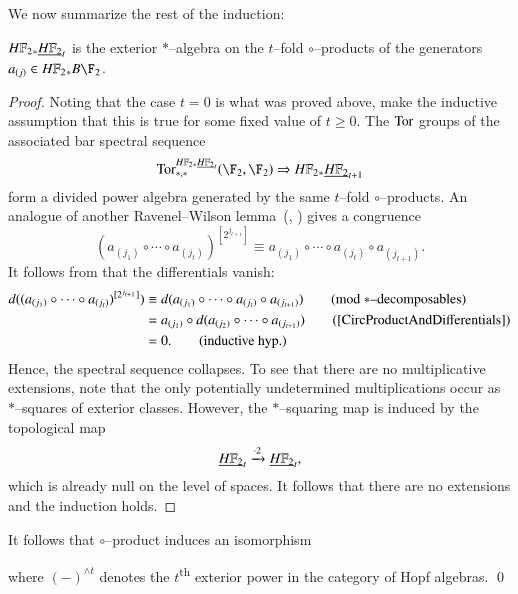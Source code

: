 We now summarize the rest of the induction:
\begin{theorem}\label{UnstableSteenrodInduction}
$\HFtwo_* \OS{\HFtwo}{t}$ is the exterior $\ast$--algebra on the $t$--fold $\circ$--products of the generators $a_{(j)} \in \HFtwo_* B\F_2$.
\end{theorem}
\begin{proof}
Noting that the case $t = 0$ is what was proved above, make the inductive assumption that this is true for some fixed value of $t \ge 0$.  The $\operatorname{Tor}$ groups of the associated bar spectral sequence \[\Tor^{\HFtwo_* \OS{\HFtwo}{t}}_{*, *}(\F_2, \F_2) \Rightarrow \HFtwo_* \OS{\HFtwo}{t+1}\] form a divided power algebra generated by the same $t$--fold $\circ$--products.  An analogue of another Ravenel--Wilson lemma~(\cite[Lemma 9.5]{RavenelWilsonKthyOfEMSpaces}, \cite[Claim 8.16]{Wilson}) gives a congruence \[(a_{(j_1)} \circ \cdots \circ a_{(j_t)})^{[2^{j_{t+1}}]} \equiv a_{(j_1)} \circ \cdots \circ a_{(j_t)} \circ a_{(j_{t+1})} \tag{mod $\ast$--decomposables}.\]  It follows from  that the differentials vanish:
\begin{align*}
d((a_{(j_1)} \circ \cdots \circ a_{(j_t)})^{[2^{j_{t+1}}]}) & \equiv d(a_{(j_1)} \circ \cdots \circ a_{(j_t)} \circ a_{(j_{t+1})}) \tag{mod $\ast$--decomposables} \\
& = a_{(j_1)} \circ d(a_{(j_2)} \circ \cdots \circ a_{(j_{t+1})}) \tag{\Cref{CircProductAndDifferentials}} \\
& = 0. \tag{inductive hyp.}
\end{align*}
Hence, the spectral sequence collapses.  To see that there are no multiplicative extensions, note that the only potentially undetermined multiplications occur as $\ast$--squares of exterior classes.  However, the $\ast$--squaring map is induced by the topological map \[\OS{\HFtwo}{t} \xrightarrow{\cdot 2} \OS{\HFtwo}{t},\] which is already null on the level of spaces.  It follows that there are no extensions and the induction holds.
\end{proof}

\begin{corollary}
It follows that $\circ$--product induces an isomorphism
\begin{center}
\end{center}
where $(-)^{\wedge t}$ denotes the $t$\textsuperscript{th} exterior power in the category of Hopf algebras. \qed
\end{corollary}


